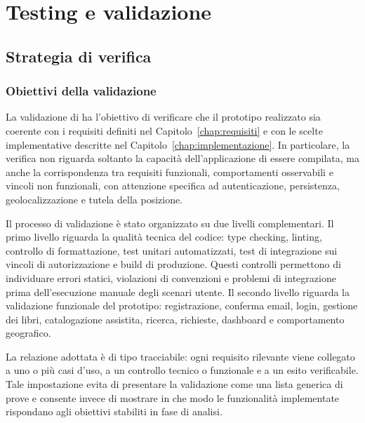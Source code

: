 \chapter{Testing e validazione}
\label{chap:testing-validazione}


\section{Strategia di verifica}
\label{sec:strategia-testing}

\subsection{Obiettivi della validazione}
\label{subsec:obiettivi-validazione}

La validazione di \projectname{} ha l'obiettivo di verificare che il prototipo realizzato sia coerente con i requisiti definiti nel Capitolo~\ref{chap:requisiti} e con le scelte implementative descritte nel Capitolo~\ref{chap:implementazione}. In particolare, la verifica non riguarda soltanto la capacità dell'applicazione di essere compilata, ma anche la corrispondenza tra requisiti funzionali, comportamenti osservabili e vincoli non funzionali, con attenzione specifica ad autenticazione, persistenza, geolocalizzazione e tutela della posizione.

Il processo di validazione è stato organizzato su due livelli complementari. Il primo livello riguarda la qualità tecnica del codice: type checking, linting, controllo di formattazione, test unitari automatizzati, test di integrazione sui vincoli di autorizzazione e build di produzione. Questi controlli permettono di individuare errori statici, violazioni di convenzioni e problemi di integrazione prima dell'esecuzione manuale degli scenari utente. Il secondo livello riguarda la validazione funzionale del prototipo: registrazione, conferma email, login, gestione dei libri, catalogazione assistita, ricerca, richieste, dashboard e comportamento geografico.

La relazione adottata è di tipo tracciabile: ogni requisito rilevante viene collegato a uno o più casi d'uso, a un controllo tecnico o funzionale e a un esito verificabile. Tale impostazione evita di presentare la validazione come una lista generica di prove e consente invece di mostrare in che modo le funzionalità implementate rispondano agli obiettivi stabiliti in fase di analisi.

